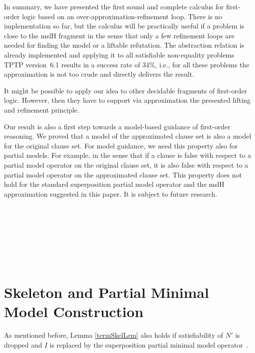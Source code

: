 \documentclass{llncs}
\begin{document}
In summary, we have presented the first sound and complete calculus for
first-order logic based on an over-approximation-refinement loop. There
is no implementation so far, but the calculus will be practically useful if a problem
is close to the mslH fragment in the sense that only a few refinement loops
are needed for finding the model or a liftable refutation. 
The abstraction relation is already implemented and applying it to all satisfiable non-equality
problems TPTP version~6.1 results in a success rate of 34\%, i.e., for all these problems
the approximation is not too crude and directly delivers the result.

It might be possible
to apply our idea to other decidable fragments of first-order logic.
However, then they have to support via approximation the presented lifting and refinement
principle. 

Our result is also a first step towards a  model-based guidance of first-order
reasoning. We proved that a model of the approximated clause set is also a model for the
original clause set. For model guidance, we need this property also for partial models. For example,
in the sense that if a clause is false with respect to a partial model operator on
the original clause set, it is also false with respect to a partial model operator on
the approximated clause set. This property does not hold for the standard superposition partial
model operator and the mslH approximation suggested in this paper. It is subject to future research.




\clearpage
\appendix






\ \\
\ \\
\ \\
\ \\
\ \\
\ \\

\section{Skeleton and Partial Minimal Model Construction}

As mentioned before, Lemma \ref{termSkelLem} also holds if satisfiability of $N'$ is dropped and $I$ is replaced
by the superposition partial minimal model operator~\cite{Weidenbach01handbook}.
\end{document}
